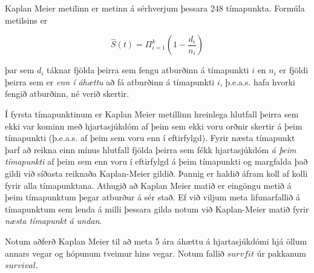 \documentclass[
]{book}
\begin{document}
Kaplan Meier metilinn er metinn á sérhverjum þessara 248 tímapunkta. Formúla metilsins er

\[ \hat S(t) = \Pi_{i=1}^k \left( 1- \frac{d_i}{n_i} \right)\]

þar sem \(d_i\) táknar fjölda þeirra sem fengu atburðinn á tímapunkti \(i\) en \(n_i\) er fjöldi þeirra sem er \emph{enn í áhættu} að fá atburðinn á tímapunkti \(i\), þ.e.a.s. hafa hvorki fengið atburðinn, né verið skertir.

Í fyrsta tímapunktinum er Kaplan Meier metillinn hreinlega hlutfall þeirra sem ekki var kominn með hjartasjúkdóm af þeim sem ekki voru orðnir skertir á þeim tímapunkti (þ.e.a.s. af þeim sem voru enn í eftirfylgd). Fyrir næsta tímapunkt þarf að reikna einn mínus hlutfall fjölda þeirra sem fékk hjartasjúkdóm \emph{á þeim tímapunkti} af þeim sem enn voru í eftirfylgd á þeim tímapunkti og margfalda það gildi við síðasta reiknaða Kaplan-Meier gildið. Þannig er haldið áfram koll af kolli fyrir alla tímapunktana. Athugið að Kaplan Meier matið er eingöngu metið á þeim tímapunktum þegar atburður á sér stað. Ef við viljum meta lifunarfallið á tímapunktum sem lenda á milli þessara gilda notum við Kaplan-Meier matið fyrir \emph{næsta tímapunkt á undan}.

Notum aðferð Kaplan Meier til að meta 5 ára áhættu á hjartasjúkdómi hjá öllum annars vegar og hópunum tveimur hins vegar. Notum fallið \(survfit\) úr pakkanum \(survival\).
\end{document}
